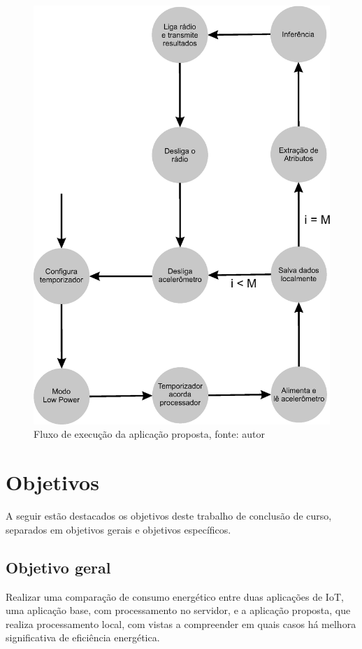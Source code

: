 \documentclass[a5paper]{ufsc-thesis}  %
\begin{document}
\begin{figure}[!ht]
    \centering
    \includegraphics[width=0.8\linewidth]{imagens/prop_app.eps}
    \caption{Fluxo de execução da aplicação proposta, fonte: autor}
    \label{fig:prop_app}
\end{figure}

\section{Objetivos}
A seguir estão destacados os objetivos deste trabalho de conclusão de curso, separados em objetivos gerais e objetivos específicos.

\subsection{Objetivo geral}
Realizar uma comparação de consumo energético entre duas aplicações de IoT, uma aplicação base, com processamento no servidor, e a aplicação proposta, que realiza processamento local, com vistas a compreender em quais casos há melhora significativa de eficiência energética.
\end{document}
